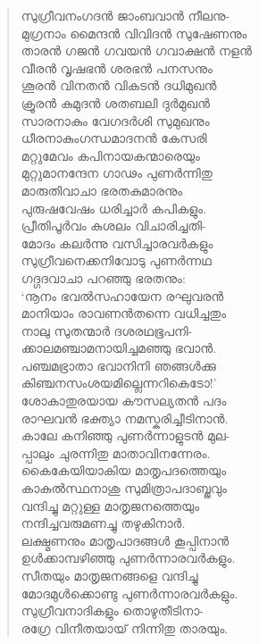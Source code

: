 \begin{verse}
സുഗ്രീവനംഗദന്‍ ജാംബവാന്‍ നീലനു-\\
മുഗ്രനാം മൈന്ദന്‍ വിവിദന്‍ സുഷേണനും\\
താരന്‍ ഗജന്‍ ഗവയന്‍ ഗവാക്ഷന്‍ നളന്‍\\
വീരന്‍ വൃഷഭന്‍ ശരഭന്‍ പനസനും\\
ശൂരന്‍ വിനതന്‍ വികടന്‍ ദധിമുഖന്‍\\
ക്രൂരന്‍ കുമുദന്‍ ശതബലി ദുര്‍മുഖന്‍\\
സാരനാകും വേഗദര്‍ശി സുമുഖനും\\
ധീരനാകുംഗന്ധമാദനന്‍ കേസരി\\
മറ്റുമേവം കപിനായകന്മാരെയും\\
മുറ്റുമാനന്ദേന ഗാഢം പുണര്‍ന്നിതു\\
മാരുതിവാചാ ഭരതകുമാരനും\\
പുരുഷവേഷം ധരിച്ചാര്‍ കപികളും.\\
പ്രീതിപൂര്‍വം കുശലം വിചാരിച്ചതി-\\
മോദം കലര്‍ന്നു വസിച്ചാരവര്‍കളും\\
സുഗ്രീവനെക്കനിവോടു പുണര്‍ന്നഥ\\
ഗദ്ഗദവാചാ പറഞ്ഞു ഭരതനും:\\
‘നൂനം ഭവല്‍സഹായേന രഘുവരന്‍\\
മാനിയാം രാവണന്‍തന്നെ വധിച്ചതും\\
നാലു സുതന്മാര്‍ ദശരഥഭൂപനി-\\
ക്കാലമഞ്ചാമനായിച്ചമഞ്ഞു ഭവാന്‍.\\
പഞ്ചമഭ്രാതാ ഭവാനിനി ഞങ്ങള്‍ക്കു\\
കിഞ്ചനസംശയമില്ലെന്നറികെടോ!’\\
ശോകാതുരയായ കൗസല്യതന്‍ പദം\\
രാഘവന്‍ ഭക്ത്യാ നമസ്കരിച്ചീടിനാന്‍.\\
കാലേ കനിഞ്ഞു പുണര്‍ന്നാളുടന്‍ മുല-\\
പ്പാലും ചുരന്നിതു മാതാവിനന്നേരം.\\
കൈകേയിയാകിയ മാതൃപദത്തെയും\\
കാകുല്‍സ്ഥനാശു സുമിത്രാപദാബ്ജവും\\
വന്ദിച്ചു മറ്റുള്ള മാതൃജനത്തെയും\\
നന്ദിച്ചവരുമണച്ചു തഴുകിനാര്‍.\\
ലക്ഷ്മണനും മാതൃപാദങ്ങള്‍ കൂപ്പിനാന്‍\\
ഉള്‍ക്കാമ്പഴിഞ്ഞു പുണര്‍ന്നാരവര്‍കളും.\\
സീതയും മാതൃജനങ്ങളെ വന്ദിച്ചു\\
മോദമുള്‍ക്കൊണ്ടു പുണര്‍ന്നാരവര്‍കളും.\\
സുഗ്രീവനാദികളും തൊഴുതീടിനാ-\\
രഗ്രേ വിനീതയായ് നിന്നിതു താരയും.\\

\end{verse}
